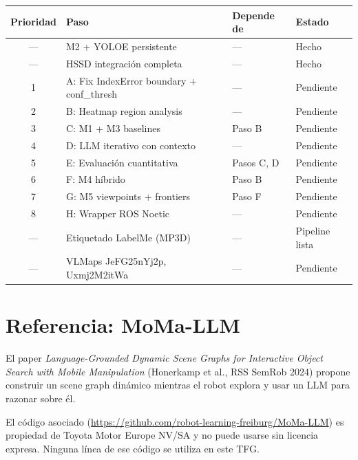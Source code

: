 \documentclass[11pt,a4paper]{article}
\begin{document}
\begin{center}
\begin{tabular}{clll}
\toprule
\textbf{Prioridad} & \textbf{Paso} & \textbf{Depende de} & \textbf{Estado} \\
\midrule
--- & M2 + YOLOE persistente & --- & \textcolor{done}{Hecho} \\
--- & HSSD integración completa & --- & \textcolor{done}{Hecho} \\
\midrule
1 & A: Fix IndexError boundary + conf\_thresh & --- & \textcolor{pendingcol}{Pendiente} \\
2 & B: Heatmap region analysis & --- & \textcolor{pendingcol}{Pendiente} \\
3 & C: M1 + M3 baselines & Paso B & \textcolor{pendingcol}{Pendiente} \\
4 & D: LLM iterativo con contexto & --- & \textcolor{pendingcol}{Pendiente} \\
5 & E: Evaluación cuantitativa & Pasos C, D & \textcolor{pendingcol}{Pendiente} \\
6 & F: M4 híbrido & Paso B & \textcolor{pendingcol}{Pendiente} \\
7 & G: M5 viewpoints + frontiers & Paso F & \textcolor{pendingcol}{Pendiente} \\
8 & H: Wrapper ROS Noetic & --- & \textcolor{pendingcol}{Pendiente} \\
\midrule
--- & Etiquetado LabelMe (MP3D) & --- & \textcolor{partialcol}{Pipeline lista} \\
--- & VLMaps JeFG25nYj2p, Uxmj2M2itWa & --- & \textcolor{partialcol}{Pendiente} \\
\bottomrule
\end{tabular}
\end{center}

\section{Referencia: MoMa-LLM}

El paper \textit{Language-Grounded Dynamic Scene Graphs for Interactive Object Search
with Mobile Manipulation} (Honerkamp et al., RSS SemRob 2024) propone construir un
scene graph dinámico mientras el robot explora y usar un LLM para razonar sobre él.

El código asociado (\url{https://github.com/robot-learning-freiburg/MoMa-LLM}) es
propiedad de Toyota Motor Europe NV/SA y no puede usarse sin licencia expresa. Ninguna
línea de ese código se utiliza en este TFG.
\end{document}
